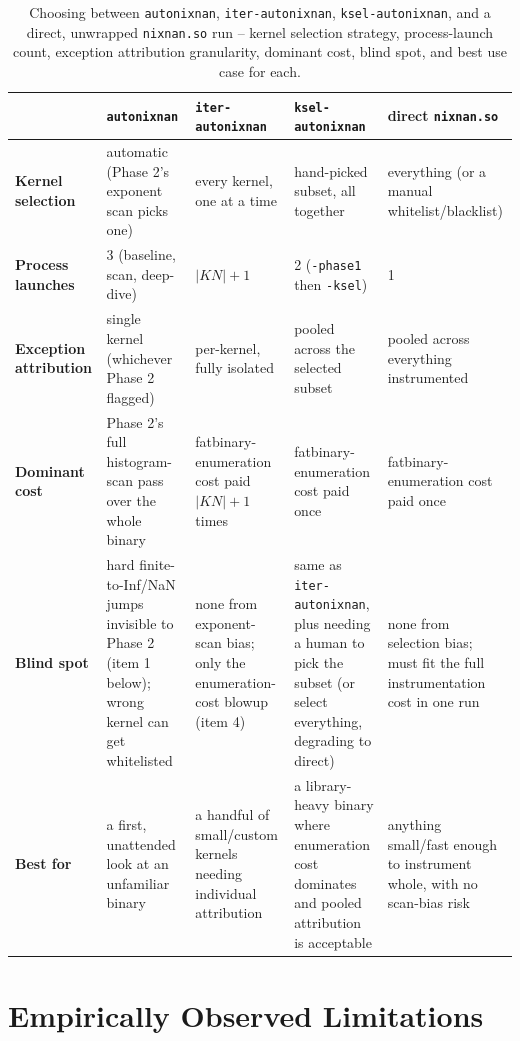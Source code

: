 \documentclass[11pt]{article}
\begin{document}
\begin{table}[p]
\centering
\small
\begin{tabular}{p{2.1cm}p{3.0cm}p{2.6cm}p{2.6cm}p{3.4cm}}
\toprule
& \textbf{\texttt{autonixnan}} & \textbf{\texttt{iter-autonixnan}} & \textbf{\texttt{ksel-autonixnan}} & \textbf{direct \texttt{nixnan.so}} \\
\midrule
\textbf{Kernel selection} &
  automatic (Phase 2's exponent scan picks one) &
  every kernel, one at a time &
  hand-picked subset, all together &
  everything (or a manual whitelist/blacklist) \\
\textbf{Process launches} &
  3 (baseline, scan, deep-dive) &
  $|KN|+1$ &
  2 (\texttt{-phase1} then \texttt{-ksel}) &
  1 \\
\textbf{Exception attribution} &
  single kernel (whichever Phase 2 flagged) &
  per-kernel, fully isolated &
  pooled across the selected subset &
  pooled across everything instrumented \\
\textbf{Dominant cost} &
  Phase 2's full histogram-scan pass over the whole binary &
  fatbinary-enumeration cost paid $|KN|+1$ times &
  fatbinary-enumeration cost paid once &
  fatbinary-enumeration cost paid once \\
\textbf{Blind spot} &
  hard finite-to-Inf/NaN jumps invisible to Phase 2 (item 1 below); wrong kernel can get whitelisted &
  none from exponent-scan bias; only the enumeration-cost blowup (item 4) &
  same as \texttt{iter-autonixnan}, plus needing a human to pick the subset (or select everything, degrading to direct) &
  none from selection bias; must fit the full instrumentation cost in one run \\
\textbf{Best for} &
  a first, unattended look at an unfamiliar binary &
  a handful of small/custom kernels needing individual attribution &
  a library-heavy binary where enumeration cost dominates and pooled attribution is acceptable &
  anything small/fast enough to instrument whole, with no scan-bias risk \\
\bottomrule
\end{tabular}
\caption{Choosing between \texttt{autonixnan}, \texttt{iter-autonixnan},
\texttt{ksel-autonixnan}, and a direct, unwrapped \texttt{nixnan.so}
run -- kernel selection strategy, process-launch count, exception
attribution granularity, dominant cost, blind spot, and best use case
for each.}
\label{tab:choosing-three}
\end{table}

\section{Empirically Observed Limitations}
\label{sec:limitations}
\end{document}
